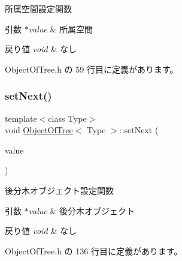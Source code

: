 所属空間設定関数 


\begin{DoxyParams}{引数}
{\em $\ast$value} & 所属空間 \\
\hline
\end{DoxyParams}

\begin{DoxyRetVals}{戻り値}
{\em void} & なし \\
\hline
\end{DoxyRetVals}


 Object\+Of\+Tree.\+h の 59 行目に定義があります。

\mbox{\label{class_object_of_tree_af1ccf3668093728d3eb8d7ed9eee6419}} 
\subsubsection{\texorpdfstring{set\+Next()}{setNext()}}
{\footnotesize\ttfamily template$<$class Type$>$ \\
void \mbox{\hyperlink{class_object_of_tree}{Object\+Of\+Tree}}$<$ Type $>$\+::set\+Next (\begin{DoxyParamCaption}\item[{\mbox{\hyperlink{class_object_of_tree}{Object\+Of\+Tree}}$<$ Type $>$ $\ast$}]{value }\end{DoxyParamCaption})\hspace{0.3cm}{\ttfamily [inline]}}



後分木オブジェクト設定関数 


\begin{DoxyParams}{引数}
{\em $\ast$value} & 後分木オブジェクト \\
\hline
\end{DoxyParams}

\begin{DoxyRetVals}{戻り値}
{\em void} & なし \\
\hline
\end{DoxyRetVals}


 Object\+Of\+Tree.\+h の 136 行目に定義があります。

\mbox{\label{class_object_of_tree_aae14cb0e8ac8b701de737c547a1d3b8c}} 
